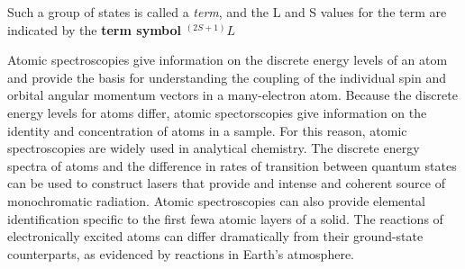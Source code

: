 \documentclass[a4paper,titlepage]{article}
\begin{document}
\begin{frame}
{\medskip Such a group of states is called a \textit{term}, and the L and S values for the term are indicated by the \textbf{term symbol} \(^{(2S+1)}L\)
}


\end{frame}


Atomic spectroscopies give information on the discrete energy levels of an atom and provide the basis for understanding the coupling of the individual spin and orbital angular momentum vectors in a many-electron atom. Because the discrete energy levels for atoms differ, atomic spectorscopies give information on the identity and concentration of atoms in a sample. For this reason, atomic spectroscopies are widely used in analytical chemistry. The discrete energy spectra of atoms and the difference in rates of transition between quantum states can be used to construct lasers that provide and intense and coherent source of monochromatic radiation. Atomic spectroscopies can also provide elemental identification specific to the first fewa atomic layers of a solid. The reactions of electronically excited atoms can differ dramatically from their ground-state counterparts, as evidenced by reactions in Earth's atmosphere.
\end{document}
